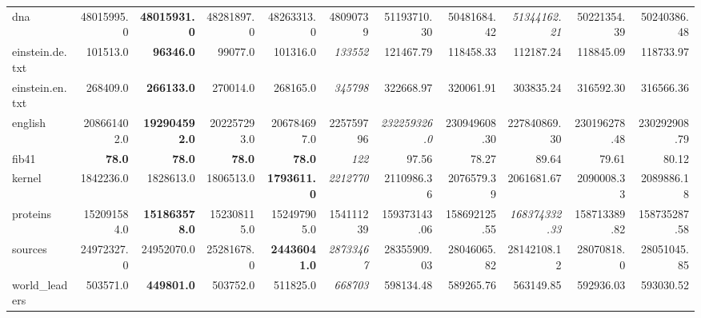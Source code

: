 \documentclass[10pt,a4paper]{standalone}
\begin{document}
\begin{tabular}{|l|r|r|r|r|r|r|r|r|r|r|}
              dna &    48015995.0 &  \textbf{48015931.0} &    48281897.0 &          48263313.0 &        48090739 &        51193710.30 & 50481684.42 & \emph{51344162.21} & 50221354.39 & 50240386.48 \\
  einstein.de.txt &      101513.0 &     \textbf{96346.0} &       99077.0 &            101316.0 &   \emph{133552} &        121467.79 & 118458.33 &        112187.24 & 118845.09 &  118733.97 \\
  einstein.en.txt &      268409.0 &    \textbf{266133.0} &      270014.0 &            268165.0 &   \emph{345798} &         322668.97 & 320061.91 &        303835.24 & 316592.30 & 316566.36 \\
          english &   208661402.0 & \textbf{192904592.0} &   202257293.0 &         206784697.0 &       225759796 &      \emph{232259326.0} &  230949608.30 &         227840869.30 & 230196278.48 & 230292908.79 \\
            fib41 & \textbf{78.0} &        \textbf{78.0} & \textbf{78.0} &       \textbf{78.0} &      \emph{122} &        97.56 & 78.27 &        89.64 & 79.61 & 80.12 \\
           kernel &     1842236.0 &            1828613.0 &     1806513.0 &  \textbf{1793611.0} &  \emph{2212770} &        2110986.36 & 2076579.39 &        2061681.67 & 2090008.33 & 2089886.18 \\
         proteins &   152091584.0 & \textbf{151863578.0} &   152308115.0 &         152497905.0 &       154111239 &        159373143.06 & 158692125.55 & \emph{168374332.33} & 158713389.82 & 158735287.58 \\
          sources &    24972327.0 &           24952070.0 &    25281678.0 & \textbf{24436041.0} & \emph{28733467} &         28355909.03 & 28046065.82 &        28142108.12 &       28070818.0 & 28051045.85 \\
   world\_leaders &      503571.0 &    \textbf{449801.0} &      503752.0 &            511825.0 &   \emph{668703} &        598134.48 & 589265.76 &        563149.85 &  592936.03 & 593030.52 \\
\hline
\end{tabular}
\end{document}
